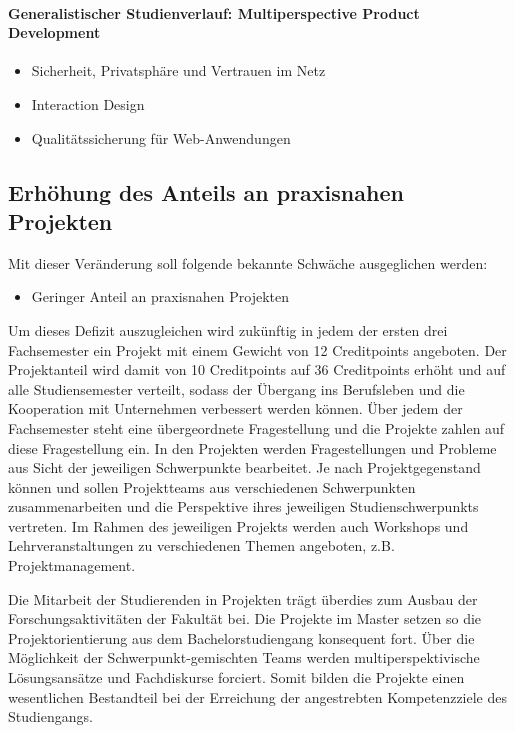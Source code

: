 \paragraph{Generalistischer Studienverlauf: Multiperspective Product
Development}\label{generalistischer-studienverlauf-multiperspective-product-development}

\begin{itemize}
\tightlist
\item
  Sicherheit, Privatsphäre und Vertrauen im Netz
\item
  Interaction Design
\item
  Qualitätssicherung für Web-Anwendungen
\end{itemize}

\subsection{Erhöhung des Anteils an praxisnahen
Projekten}\label{erhuxf6hung-des-anteils-an-praxisnahen-projekten}

Mit dieser Veränderung soll folgende bekannte Schwäche ausgeglichen
werden:

\begin{itemize}
\tightlist
\item
  Geringer Anteil an praxisnahen Projekten
\end{itemize}

Um dieses Defizit auszugleichen wird zukünftig in jedem der ersten drei
Fachsemester ein Projekt mit einem Gewicht von 12 Creditpoints
angeboten. Der Projektanteil wird damit von 10 Creditpoints auf 36
Creditpoints erhöht und auf alle Studiensemester verteilt, sodass der
Übergang ins Berufsleben und die Kooperation mit Unternehmen verbessert
werden können. Über jedem der Fachsemester steht eine übergeordnete
Fragestellung und die Projekte zahlen auf diese Fragestellung ein. In
den Projekten werden Fragestellungen und Probleme aus Sicht der
jeweiligen Schwerpunkte bearbeitet. Je nach Projektgegenstand können und
sollen Projektteams aus verschiedenen Schwerpunkten zusammenarbeiten und
die Perspektive ihres jeweiligen Studienschwerpunkts vertreten. Im
Rahmen des jeweiligen Projekts werden auch Workshops und
Lehrveranstaltungen zu verschiedenen Themen angeboten, z.B.
Projektmanagement.

Die Mitarbeit der Studierenden in Projekten trägt überdies zum Ausbau
der Forschungsaktivitäten der Fakultät bei. Die Projekte im Master
setzen so die Projektorientierung aus dem Bachelorstudiengang konsequent
fort. Über die Möglichkeit der Schwerpunkt-gemischten Teams werden
multiperspektivische Lösungsansätze und Fachdiskurse forciert. Somit
bilden die Projekte einen wesentlichen Bestandteil bei der Erreichung
der angestrebten Kompetenzziele des Studiengangs.


